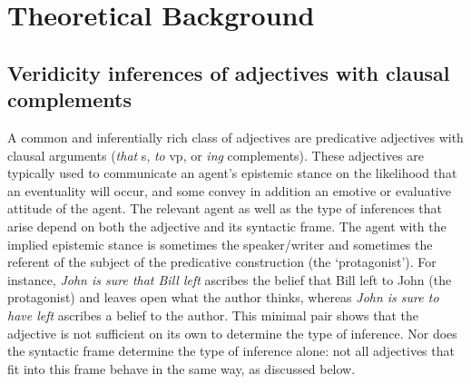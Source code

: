 \documentclass[10pt]{article}
\begin{document}
 
%

\section{Theoretical Background}
\vspace{-.2mm}

\subsection{Veridicity inferences of adjectives with clausal complements}\label{sec-veridicity}
\vspace {-2mm}

A common and inferentially rich class of adjectives are predicative adjectives with clausal arguments (\emph{that} {\sc s}, \emph{to} {\sc vp}, or \emph{ing} complements). These adjectives are typically used to communicate an agent's epistemic stance on the likelihood that an eventuality will occur, and some convey in addition an emotive or evaluative attitude of the agent. The relevant agent as well as the type of inferences that arise depend
on both the adjective and its syntactic frame.  The agent with the
implied epistemic stance is sometimes the speaker/writer and sometimes
the referent of the subject of the predicative construction (the
`protagonist').  For instance, \textit{John is sure that Bill left}
ascribes the belief that Bill left to John (the protagonist) and
leaves open what the author thinks, whereas \textit{John is sure to have
left} ascribes a belief to the author. This minimal pair shows that the adjective is not sufficient on its own to determine the type of inference. 
Nor does the syntactic frame determine the type of inference alone: not all adjectives that fit into this frame behave in the same way, as discussed below.
\end{document}
